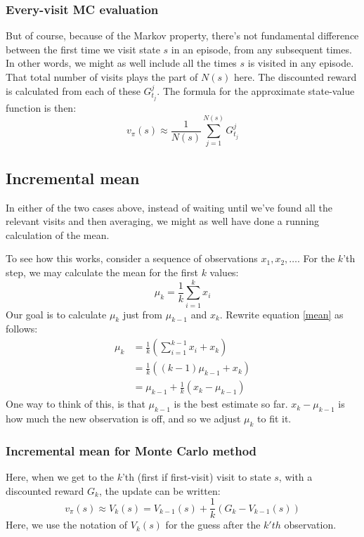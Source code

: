 \documentclass[12pt, a4paper]{article}
\numberwithin{equation}{section}
\begin{document}
\subsubsection{Every-visit MC evaluation}
But of course, because of the Markov property, there's not fundamental difference between the first time we visit state $s$ in an episode, from any subsequent times. In other words, we might as well include all the times $s$ is visited in any episode. That total number of visits plays the part of $N(s)$ here. The discounted reward is calculated from each of these $G^j_{t_j}$. The formula for the approximate state-value function is then:
\begin{equation}
v_\pi(s)\approx\frac{1}{N(s)}\sum_{j=1}^{N(s)} G^j_{t_j}
\end{equation}

\subsection{Incremental mean}
In either of the two cases above, instead of waiting until we've found all the relevant visits and then averaging, we might as well have done a running calculation of the mean.

To see how this works, consider a sequence of observations $x_1,x_2,\ldots$. For the $k$'th step, we may calculate the mean for the first $k$ values:
\begin{equation}
\mu_k=\frac{1}{k}\sum_{i=1}^k x_i
\label{mean}
\end{equation}
Our goal is to calculate $\mu_k$ just from $\mu_{k-1}$ and $x_k$. Rewrite equation \ref{mean} as follows:
\begin{align}
\mu_k&=\frac{1}{k}\left(\sum_{i=1}^{k-1}x_i+x_k\right)\\
&=\frac{1}{k}((k-1)\mu_{k-1}+x_k)\\
&=\mu_{k-1}+\frac{1}{k}(x_k-\mu_{k-1})
\end{align}
One way to think of this, is that $\mu_{k-1}$ is the best estimate so far. $x_k-\mu_{k-1}$ is how much the new observation is off, and so we adjust $\mu_k$ to fit it.

\subsubsection{Incremental mean for Monte Carlo method}
Here, when we get to the $k$'th (first if first-visit) visit to state $s$, with a discounted reward $G_k$, the update can be written:
\begin{equation}
v_\pi(s)\approx V_k(s)=V_{k-1}(s)+\frac{1}{k}(G_k-V_{k-1}(s))
\end{equation}
Here, we use the notation of $V_k(s)$ for the guess after the $k'th$ observation.
\end{document}
